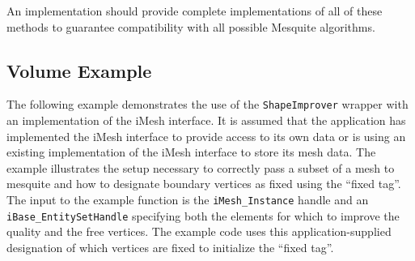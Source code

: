 An implementation should provide complete implementations of all of these methods to guarantee compatibility with all possible Mesquite algorithms. 

\subsection{Volume Example}

The following example demonstrates the use of the \texttt{ShapeImprover} wrapper with an implementation of the iMesh interface.  It is assumed that the application has implemented the iMesh interface to provide access to its own data or is using an existing implementation of the iMesh interface to store its mesh data.  The example illustrates the setup necessary to correctly pass a subset of a mesh to mesquite and how to designate boundary vertices as fixed using the ``fixed tag''.  The input to the example function is the \texttt{iMesh\_Instance} handle and an \texttt{iBase\_EntitySetHandle} specifying both the elements for which to improve the quality and the free vertices.  The example code uses this application-supplied designation of which vertices are fixed to initialize the ``fixed tag''.

